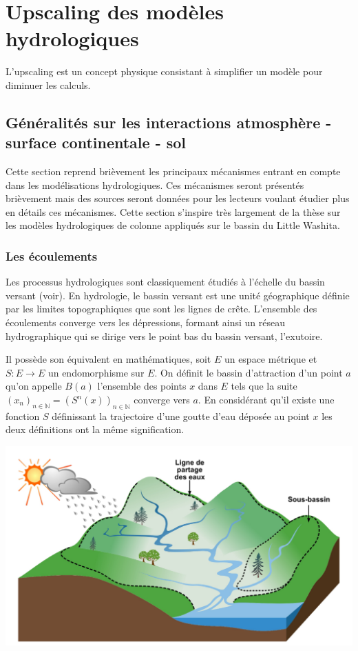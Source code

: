 \documentclass[a4paper,10pt]{article}
\begin{document}
\section{Upscaling des modèles hydrologiques}
\label{upscaling}

L'upscaling est un concept physique consistant à simplifier un modèle pour diminuer les calculs.

\subsection{Généralités sur les interactions atmosphère - surface continentale - sol}
Cette section reprend brièvement les principaux mécanismes entrant en compte dans les modélisations hydrologiques. Ces mécanismes seront présentés brièvement mais des sources seront données pour les lecteurs voulant étudier plus en détails ces mécanismes. Cette section s'inspire très largement de la thèse \cite{maquin2016developpement} sur les modèles hydrologiques de colonne appliqués sur le bassin du Little Washita. 
 
\subsubsection{Les écoulements}

Les processus hydrologiques sont classiquement étudiés à l’échelle du bassin versant (voir). En hydrologie, le bassin versant est une unité géographique définie par les limites topographiques que sont les lignes de crête. L’ensemble des écoulements converge vers les dépressions, formant ainsi un réseau hydrographique qui se dirige vers le point bas du bassin versant, l’exutoire.

Il possède son équivalent en mathématiques, soit $E$ un espace métrique et $S:E\to E$ un endomorphisme sur $E$. On définit le bassin d'attraction d'un point $a$ qu'on appelle $B(a)$ l'ensemble des points $x$ dans $E$ tels que la suite $(x_n)_{n \in \mathbb{N}}=(S^n(x))_{n \in \mathbb{N}}$ converge vers $a$. En considérant qu'il existe une fonction $S$ définissant la trajectoire d'une goutte d'eau déposée au point $x$ les deux définitions ont la même signification.

\begin{center}
	\includegraphics[scale=0.15]{bassin_versant.png}
\end{center} 
\end{document}
